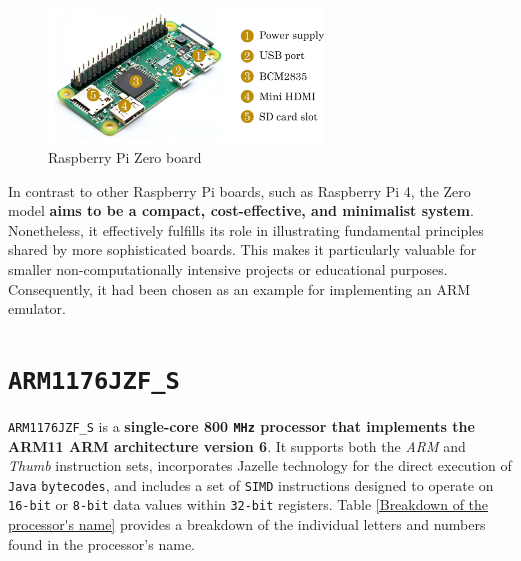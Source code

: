 \documentclass[english, ing, kiv, he, iso690numb, pdf]{fasthesis}
\begin{document}
	\begin{figure}[ht]
		\centering
		\includegraphics[width=0.65\textwidth]{img/diagrams/rpi_zero.pdf}
		\caption{Raspberry Pi Zero board}
		\label{Raspberry Pi Zero board}
	\end{figure}
	
	In contrast to other Raspberry Pi boards, such as Raspberry Pi 4, the Zero model \textbf{aims to be a compact, cost-effective, and minimalist system}. Nonetheless, it effectively fulfills its role in illustrating fundamental principles shared by more sophisticated boards. This makes it particularly valuable for smaller non-computationally intensive projects or educational purposes. Consequently, it had been chosen as an example for implementing an ARM emulator.
	
	\section{\texttt{ARM1176JZF\_S}}
	
	\texttt{ARM1176JZF\_S} is a \textbf{single-core 800 \texttt{MHz} processor that implements the ARM11 ARM architecture version 6}. It supports both the \textit{ARM} and \textit{Thumb} instruction sets, incorporates Jazelle technology for the direct execution of \texttt{Java} \texttt{bytecodes}, and includes a set of \texttt{SIMD} instructions designed to operate on \texttt{16-bit} or \texttt{8-bit} data values within \texttt{32-bit} registers. Table \ref{Breakdown of the processor's name} provides a breakdown of the individual letters and numbers found in the processor's name.
	
\end{document}
